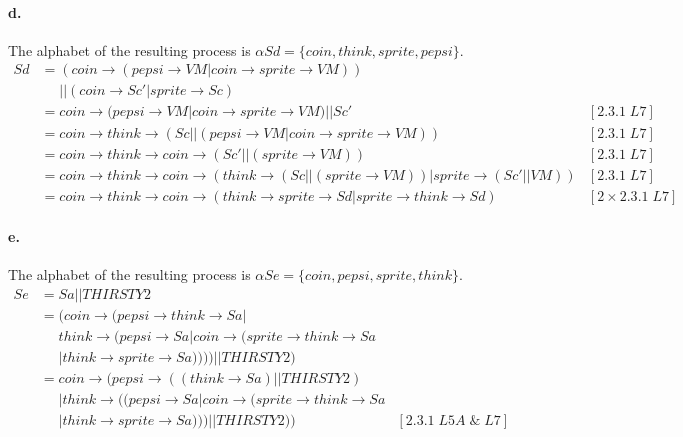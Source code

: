 \documentclass[a4paper, 11pt]{article}
\begin{document}

\paragraph{d.} %
\label{par:d_}

The alphabet of the resulting process is $\alpha Sd = \{coin, think, sprite, pepsi \}$.
\begin{align*}
Sd &= (coin \rightarrow (pepsi \rightarrow VM | coin \rightarrow sprite \rightarrow VM)) \\
   &\phantom{=} || (coin \rightarrow Sc' | sprite \rightarrow Sc) \\
   &= coin \rightarrow (pepsi \rightarrow VM | coin \rightarrow sprite \rightarrow VM) || Sc' & [2.3.1\;L7] \\
   &= coin \rightarrow think \rightarrow (Sc || (pepsi \rightarrow VM | coin \rightarrow sprite \rightarrow VM)) & [2.3.1\;L7] \\
   &= coin \rightarrow think \rightarrow coin \rightarrow (Sc' || (sprite \rightarrow VM)) & [2.3.1\;L7] \\
   &= coin \rightarrow think \rightarrow coin \rightarrow (think \rightarrow (Sc || (sprite \rightarrow VM)) | sprite \rightarrow (Sc' || VM)) & [2.3.1\;L7] \\
   &= coin \rightarrow think \rightarrow coin \rightarrow (think \rightarrow sprite \rightarrow Sd | sprite \rightarrow think \rightarrow Sd) & [2 \times 2.3.1\;L7]
\end{align*}


\paragraph{e.} %
\label{par:e_}

The alphabet of the resulting process is $\alpha Se = \{ coin, pepsi, sprite, think \}$.
\begin{align*}
Se &= Sa || THIRSTY2 \\
   &= (coin \rightarrow (pepsi \rightarrow think \rightarrow Sa | \\
   &\phantom{=} think \rightarrow (pepsi \rightarrow Sa | coin \rightarrow (sprite \rightarrow think \rightarrow Sa \\
   &\phantom{=} | think \rightarrow sprite \rightarrow Sa)))) || THIRSTY2) \\
   &= coin \rightarrow (pepsi \rightarrow ((think \rightarrow Sa) || THIRSTY2) \\
   &\phantom{=} | think \rightarrow ((pepsi \rightarrow Sa | coin \rightarrow (sprite \rightarrow think \rightarrow Sa \\
   &\phantom{=} | think \rightarrow sprite \rightarrow Sa))) || THIRSTY2)) & [2.3.1\;L5A\;\&\;L7] \\
\end{align*}
\end{document}
